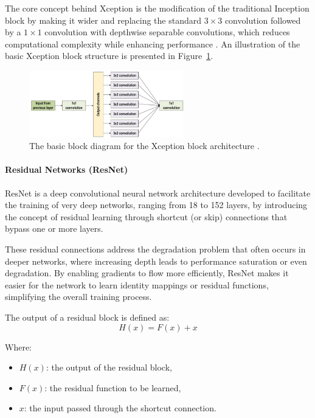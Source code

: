 The core concept behind Xception is the modification of the traditional Inception block by making it wider and replacing the standard $3 \times 3$ convolution followed by a $1 \times 1$ convolution with depthwise separable convolutions, which reduces computational complexity while enhancing performance \parencite{alzubaidi2021review}. An illustration of the basic Xception block structure is presented in Figure~\ref{fig:figure10}.


\begin{figure}[H] %
    \centering
    \includegraphics[width=0.6\textwidth]{chapters/chapter1/images/Figure10.png}
    \caption{The basic block diagram for the Xception block architecture \parencite{alzubaidi2021review}.}
    \label{fig:figure10}
\end{figure}

\paragraph{Residual Networks (ResNet)}
ResNet is a deep convolutional neural network architecture developed to facilitate the training of very deep networks, ranging from 18 to 152 layers, by introducing the concept of residual learning through shortcut (or skip) connections that bypass one or more layers.

These residual connections address the degradation problem that often occurs in deeper networks, where increasing depth leads to performance saturation or even degradation. By enabling gradients to flow more efficiently, ResNet makes it easier for the network to learn identity mappings or residual functions, simplifying the overall training process.

The output of a residual block is defined as:
\begin{equation}
    H(x) = F(x) + x  \tag{3}
\end{equation}

Where:
\begin{itemize}
    \item $H(x)$: the output of the residual block,
    \item $F(x)$: the residual function to be learned,
    \item $x$: the input passed through the shortcut connection.
\end{itemize}

